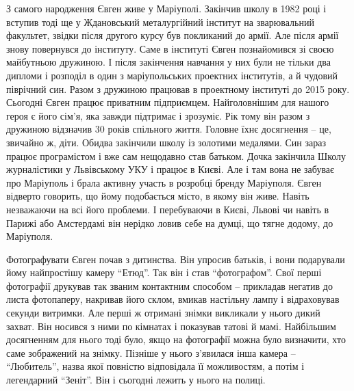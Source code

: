 З самого народження Євген живе у Маріуполі. Закінчив школу в 1982 році і
вступив тоді ще у Ждановський металургійний інститут на зварювальний факультет,
звідки після другого курсу був покликаний до армії. Але після армії знову
повернувся до інституту. Саме в інституті Євген познайомився зі своєю
майбутньою дружиною. І після закінчення навчання у них були не тільки два
дипломи і розподіл в один з маріупольських проектних інститутів, а й чудовий
піврічний син. Разом з дружиною працював в проектному інституті до 2015 року.
Сьогодні Євген працює приватним підприємцем. Найголовнішим для нашого героя є
його сім’я, яка завжди підтримає і зрозуміє. Рік тому він разом з дружиною
відзначив 30 років спільного життя. Головне їхнє досягнення – це, звичайно ж,
діти. Обидва закінчили школу із золотими медалями. Син зараз працює
програмістом і вже сам нещодавно став батьком. Дочка закінчила Школу
журналістики у Львівському УКУ і працює в Києві. Але і там вона не забуває про
Маріуполь і брала активну участь в розробці бренду Маріуполя. Євген відверто
говорить, що йому подобається місто, в якому він живе. Навіть незважаючи на всі
його проблеми. І перебуваючи в Києві, Львові чи навіть в Парижі або Амстердамі
він нерідко ловив себе на думці, що тягне додому, до Маріуполя.

Фотографувати Євген почав з дитинства. Він упросив батьків, і вони подарували
йому найпростішу камеру \enquote{Етюд}. Так він і став \enquote{фотографом}. Свої перші
фотографії друкував так званим контактним способом – прикладав негатив до листа
фотопаперу, накривав його склом, вмикав настільну лампу і відраховував секунди
витримки. Але перші ж отримані знімки викликали у нього дикий захват. Він
носився з ними по кімнатах і показував татові й мамі. Найбільшим досягненням
для нього тоді було, якщо на фотографії можна було визначити, хто саме
зображений на знімку. Пізніше у нього з'явилася інша камера – \enquote{Любитель}, назва
якої повністю відповідала її можливостям, а потім і легендарний \enquote{Зеніт}. Він і
сьогодні лежить у нього на полиці. 


